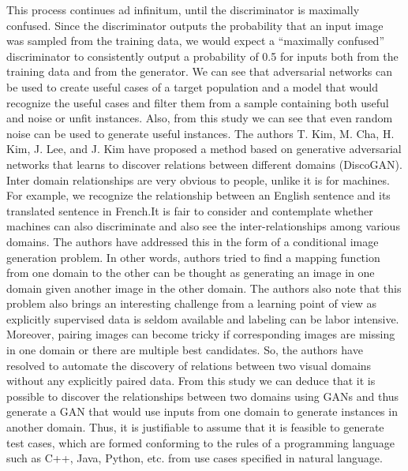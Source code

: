 \documentclass[conference]{IEEEtran}
\begin{document}
This process continues ad infinitum, until the discriminator
is maximally confused. Since the discriminator outputs
the probability that an input image was sampled from the
training data, we would expect a “maximally confused” discriminator
to consistently output a probability of 0.5 for
inputs both from the training data and from the generator.
\cite{b2} We can see that adversarial networks can be used to create useful cases of a target population and a model that would recognize the useful cases and filter them from a sample containing both useful and noise or unfit instances. Also, from this study we can see that even random noise can be used to generate useful instances.\newline
The authors T. Kim, M. Cha, H. Kim, J. Lee, and J. Kim have proposed a method based on generative adversarial networks that learns to discover relations between different domains
(DiscoGAN). Inter domain relationships are very obvious to people, unlike it is for machines. For example, we recognize the relationship between an English sentence and its translated sentence in French.It is fair to consider and contemplate whether machines can also discriminate and also see the inter-relationships among various domains. The authors have addressed this in the form of a conditional image generation problem. In other words, authors tried to find a mapping function from one domain to the other can be thought as generating an image in one domain
given another image in the other domain. The authors also note that this problem also brings an interesting challenge from a learning point of view as explicitly supervised data is seldom available and labeling can be labor intensive. Moreover, pairing images can become tricky if corresponding images are missing in one domain or there are multiple best candidates. So, the authors have resolved to automate the discovery of relations between two visual domains without any explicitly
paired data.\cite{b3} From this study we can deduce that it is possible to discover the relationships between two domains using GANs and thus generate a GAN that would use inputs from one domain to generate instances in another domain. Thus, it is justifiable to assume that it is feasible to generate test cases, which are formed conforming to the rules of a programming language such as C++, Java, Python, etc. from use cases specified in natural language.\newline
\end{document}
